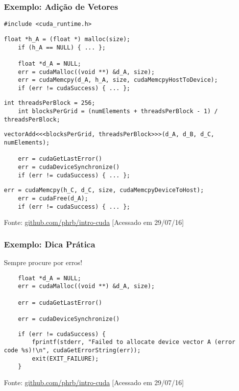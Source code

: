 \documentclass[10pt, compress]{beamer}
\begin{document}
\begin{frame}[fragile]
    \frametitle{Exemplo: Adição de Vetores}
    \begin{lstlisting}[basicstyle=\ttfamily\scriptsize]
    #include <cuda_runtime.h>
    \end{lstlisting}
    \pause
    \begin{lstlisting}[basicstyle=\ttfamily\scriptsize]
    float *h_A = (float *) malloc(size);
    if (h_A == NULL) { ... };

    float *d_A = NULL;
    err = cudaMalloc((void **) &d_A, size);
    err = cudaMemcpy(d_A, h_A, size, cudaMemcpyHostToDevice);
    if (err != cudaSuccess) { ... };
    \end{lstlisting}
    \pause
    \begin{lstlisting}[basicstyle=\ttfamily\scriptsize]
    int threadsPerBlock = 256;
    int blocksPerGrid = (numElements + threadsPerBlock - 1) / threadsPerBlock;
    \end{lstlisting}
    \pause
    \begin{lstlisting}[basicstyle=\ttfamily\scriptsize]
    vectorAdd<<<blocksPerGrid, threadsPerBlock>>>(d_A, d_B, d_C, numElements);

    err = cudaGetLastError()
    err = cudaDeviceSynchronize()
    if (err != cudaSuccess) { ... };
    \end{lstlisting}
    \pause
    \begin{lstlisting}[basicstyle=\ttfamily\scriptsize]
    err = cudaMemcpy(h_C, d_C, size, cudaMemcpyDeviceToHost);
    err = cudaFree(d_A);
    if (err != cudaSuccess) { ... };
    \end{lstlisting}

    \vfill

    \begin{center}
        \tiny{Fonte: \url{github.com/phrb/intro-cuda} [Acessado em 29/07/16]}
    \end{center}
\end{frame}

\begin{frame}[fragile]
    \frametitle{Exemplo: Dica Prática}
    \alert{Sempre} procure por erros!

    \begin{lstlisting}
    float *d_A = NULL;
    err = cudaMalloc((void **) &d_A, size);

    err = cudaGetLastError()

    err = cudaDeviceSynchronize()
    \end{lstlisting}
    \pause
    \begin{lstlisting}
    if (err != cudaSuccess) {
        fprintf(stderr, "Failed to allocate device vector A (error code %s)!\n", cudaGetErrorString(err));
        exit(EXIT_FAILURE);
    }
    \end{lstlisting}

    \begin{center}
        \tiny{Fonte: \url{github.com/phrb/intro-cuda} [Acessado em 29/07/16]}
    \end{center}
\end{frame}
\end{document}
